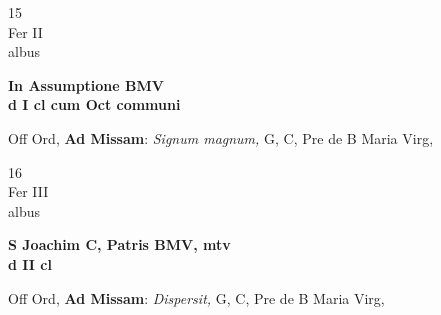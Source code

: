 \documentclass[10pt, openany]{book}
\begin{document}
        \begin{center}
            \begin{minipage}{3.5in}
                \vspace{2em}
                \begin{minipage}{0.5in}
                    {\Huge 15} \\
                    {\normalsize Fer II} \\
                    {\normalsize albus}
                \end{minipage}
                \begin{minipage}{3.0in}
                    \textbf{ \large In Assumptione BMV \\
                    \textnormal{\normalsize d I cl cum Oct communi}} \\ 
                \end{minipage}
                \begin{justify}Off Ord, \textbf{Ad Missam}: \textit{Signum magnum,} G, C, Pre de B Maria Virg,  
                \end{justify}
            \end{minipage}
        \end{center}
    
        \begin{center}
            \begin{minipage}{3.5in}
                \vspace{2em}
                \begin{minipage}{0.5in}
                    {\Huge 16} \\
                    {\normalsize Fer III} \\
                    {\normalsize albus}
                \end{minipage}
                \begin{minipage}{3.0in}
                    \textbf{ \large S Joachim C, Patris BMV, mtv \\
                    \textnormal{\normalsize d II cl}} \\ 
                \end{minipage}
                \begin{justify}Off Ord, \textbf{Ad Missam}: \textit{Dispersit,} G, C, Pre de B Maria Virg,  
                \end{justify}
            \end{minipage}
        \end{center}
    
\end{document}
